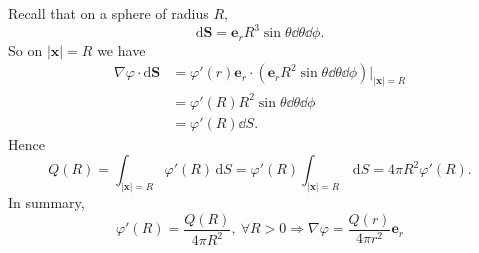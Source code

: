 Recall that on a sphere of radius $R$, 
\[
    \mathrm{d}\mathbf{S} = \mathbf{e}_r R^3 \sin \theta \dd \theta\dd \phi.
\]
So on $ |\mathbf{x}|=R $ we have
\begin{align*}
    \nabla \varphi \cdot \mathrm{d}\mathbf{S}&= \varphi'(r)\mathbf{e}_r \cdot (\mathbf{e}_r R^2 \sin \theta \dd \theta\dd \phi )\Big|_{|\mathbf{x}|=R}\\ 
    &= \varphi'(R)R^2 \sin \theta \dd \theta\dd \phi\\ 
    &= \varphi'(R)\dd S.
\end{align*}
Hence 
\[
    Q(R) = \int_{|\mathbf{x}|=R} \varphi'(R) \,\mathrm{d}S = \varphi'(R)\int_{|\mathbf{x}|=R}  \,\mathrm{d}S = 4\pi R^2 \varphi'(R).
\]
In summary,
\[
    \varphi'(R) = \frac{Q(R)}{4\pi R^2},\ \forall R>0 \Longrightarrow  \boxed{\nabla\varphi = \frac{Q(r)}{4\pi r^2}\mathbf{e}_r}
\]

